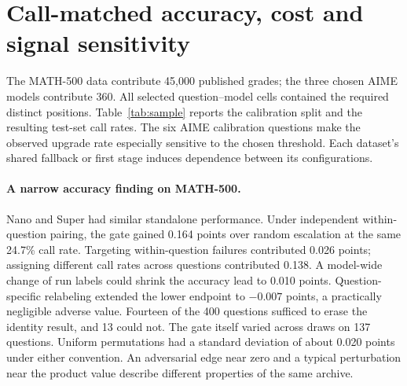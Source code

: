 \section{Call-matched accuracy, cost and signal sensitivity}\label{sec:call}
The MATH-500 data contribute 45,000 published grades; the three chosen AIME models contribute 360. All selected question--model cells contained the required distinct positions. Table~\ref{tab:sample} reports the calibration split and the resulting test-set call rates. The six AIME calibration questions make the observed upgrade rate especially sensitive to the chosen threshold. Each dataset's shared fallback or first stage induces dependence between its configurations.

\begin{table}[htbp]\centering\small
\caption{Frozen length gates. Cutoffs are recorded first-stage output tokens; calls are the fraction upgraded on evaluation questions. Accuracy columns give standalone first-stage and fallback percentages. The 1.5B token signal has missing telemetry.}\label{tab:sample}

\end{table}

\paragraph{A narrow accuracy finding on MATH-500.}
Nano and Super had similar standalone performance. Under independent within-question pairing, the gate gained 0.164 points over random escalation at the same 24.7\% call rate. Targeting within-question failures contributed 0.026 points; assigning different call rates across questions contributed 0.138. A model-wide change of run labels could shrink the accuracy lead to 0.010 points. Question-specific relabeling extended the lower endpoint to $-0.007$ points, a practically negligible adverse value. Fourteen of the 400 questions sufficed to erase the identity result, and 13 could not. The gate itself varied across draws on 137 questions. Uniform permutations had a standard deviation of about 0.020 points under either convention. An adversarial edge near zero and a typical perturbation near the product value describe different properties of the same archive.

\begin{table}[htbp]\centering\footnotesize
\caption{Accuracy difference against the call-matched random comparator, in percentage points. ID uses the archived replicate position. The two SDs refer to uniform common and question-specific permutations. Erase counts the fewest individually rematched questions needed to reach the opposite weak sign from ID. Infinity means no such rematching exists.}\label{tab:acc}

\end{table}

